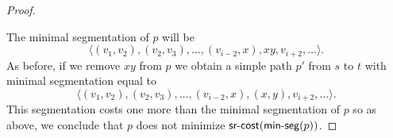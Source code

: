 \begin{proof}
\begin{center}
\end{center}

The minimal segmentation of $p$ will be
$$
\langle (v_1, v_2), (v_2, v_3), \ldots, (v_{i - 2}, x), xy, v_{i + 2}, \ldots \rangle.
$$
As before, if we remove $xy$ from $p$ we obtain a simple path $p'$ from $s$ to $t$
with minimal segmentation equal to
$$
\langle (v_1, v_2), (v_2, v_3), \ldots, (v_{i - 2}, x), (x, y), v_{i + 2}, \ldots \rangle.
$$
This segmentation costs one more than the minimal segmentation of $p$ so as above, we conclude
that $p$ does not minimize $\textsf{sr-cost}(\textsf{min-seg}(p))$.


\end{proof}
